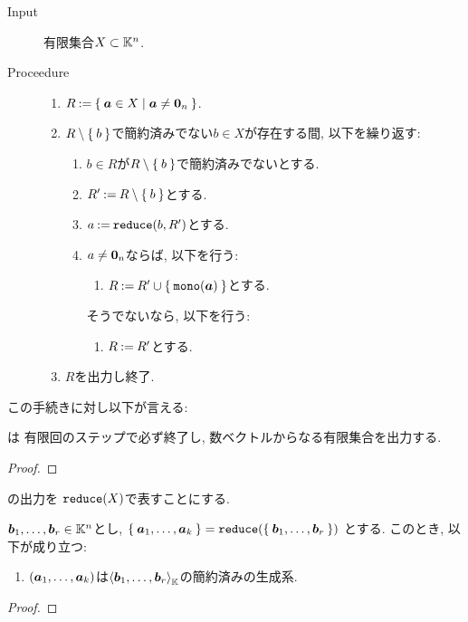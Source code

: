 \begin{algorithm}\makebox{}
  \label{alg:redens}
\begin{description}
\item[Input]
  有限集合$X\subset\mathbb{K}^n$.
\item[Proceedure]\makebox{}
  \begin{enumerate}
  \item $R\mathbin{:=} \Set{ \boldsymbol{a}\in X| \boldsymbol{a}\neq \boldsymbol{0}_n}$.
  \item $R\setminus\Set{b}$で簡約済みでない$b\in X$が存在する間,
    以下を繰り返す:
    \begin{enumerate}
    \item $b\in R$が$R\setminus\Set{b}$で簡約済みでないとする.
    \item $R'\mathbin{:=} R\setminus\Set{b}$とする.
    \item $a\mathbin{:=}\operatorname{\texttt{reduce}}(b,R')$とする.
    \item $a\neq \boldsymbol{0}_n$ならば, 以下を行う:
      \begin{enumerate}
      \item $R\mathbin{:=} R'\cup \Set{\operatorname{\texttt{mono}}(\boldsymbol{a})}$とする.
      \end{enumerate}
      そうでないなら, 以下を行う:
      \begin{enumerate}
      \item $R\mathbin{:=} R'$とする.
      \end{enumerate}
    \end{enumerate}
  \item $R$を出力し終了.
  \end{enumerate}
\end{description}
\end{algorithm}
この手続きに対し以下が言える:
\begin{prop}
  は
  有限回のステップで必ず終了し,
  数ベクトルからなる有限集合を出力する.
\end{prop}
\begin{proof}\end{proof}
の出力を
$\operatorname{\texttt{reduce}}(X)$で表すことにする.

\begin{prop}
  $\boldsymbol{b}_1,\ldots,\boldsymbol{b}_r\in\mathbb{K}^n$とし,
  $\Set{\boldsymbol{a}_1,\ldots,\boldsymbol{a}_{k}}=\operatorname{\texttt{reduce}}(\Set{\boldsymbol{b}_1,\ldots,\boldsymbol{b}_r})$
  とする.
  このとき, 以下が成り立つ:
  \begin{enumerate}
  \item $(\boldsymbol{a}_1,\ldots,\boldsymbol{a}_{k})$は$\Braket{\boldsymbol{b}_1,\ldots,\boldsymbol{b}_r}_{\mathbb{K}}$の簡約済みの生成系.
  \end{enumerate}
\end{prop}
\begin{proof}\end{proof}

